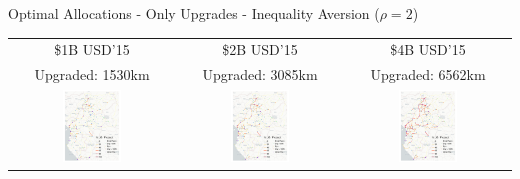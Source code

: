 \documentclass[aspectratio=169,xcolor=dvipsnames]{beamer}
\begin{document}
\begin{frame}{Optimal Allocations - Only Upgrades - Inequality Aversion ($\rho = 2$)}
\vspace{-1mm}
\begin{adjustbox}{center}
\begin{tabular}{@{}c@{}|@{}c@{}|@{}c@{}} 
\$1B USD'15 & \$2B USD'15 & \$4B USD'15 \\
Upgraded: 1530km & Upgraded: 3085km & Upgraded: 6562km \\ 
\includegraphics[width=0.38\textwidth, trim= {0.9cm 0 0.9cm 0}, clip]{"../figures/GE/trans_africa_network_GE_20g_1b_fixed_cgc_sigma3.8_rho2_julia_MACR_90kmh_google_perc_ug.pdf"} & 
\includegraphics[width=0.38\textwidth, trim= {0.9cm 0 0.9cm 0}, clip]{"../figures/GE/trans_africa_network_GE_20g_2b_fixed_cgc_sigma3.8_rho2_julia_MACR_90kmh_google_perc_ug.pdf"} &
\includegraphics[width=0.38\textwidth, trim= {0.9cm 0 0.9cm 0}, clip]{"../figures/GE/trans_africa_network_GE_20g_4b_fixed_cgc_sigma3.8_rho2_julia_MACR_90kmh_google_perc_ug.pdf"}  
\end{tabular}
\end{adjustbox}
\end{frame}
\end{document}
